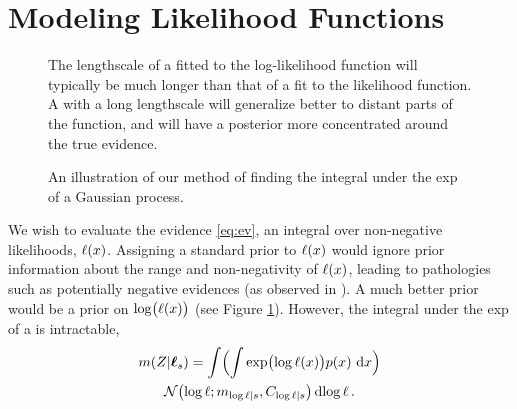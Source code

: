 \documentclass{article}
\begin{document}
\section{Modeling Likelihood Functions}\label{sec:model_lik}
%
 \begin{figure}
 \centering
 \caption{The lengthscale of a \gpb fitted to the log-likelihood function will typically be much longer than that of a \gpb fit to the likelihood function.  A \gpb with a long lengthscale will generalize better to distant parts of the function, and will have a posterior more concentrated around the true evidence. }
 \label{fig:log_is_better}
 \end{figure}
%
\begin{figure}
\centering
{}
\caption{An illustration of our method of finding the integral under the exp of a Gaussian process.}
\label{fig:delta}
\end{figure}
%
We wish to evaluate the evidence \eqref{eq:ev}, an integral over non-negative likelihoods, $\lfn(\lfv)$. Assigning a standard \gpb prior to $\lfn(\lfv)$ would ignore prior information about the range and non-negativity of $\lfn(\lfv)$, leading to pathologies such as potentially negative evidences (as observed in \citet{BZMonteCarlo}).  A much better prior would be a \gpb prior on $\log\bigl(\lfn(x)\bigr)$ (see Figure \ref{fig:log_is_better}). However, the integral under the exp of a \gpb is intractable,
\begin{multline}\label{eq:minty_l}
\mean{\If}{\vr_s}
 =\int \Bigl( \int \exp\bigl(\tr(\lfv)\bigr)\po{\lfv}\,\ud\lfv\Bigr)\\
\N{\tr}{\meancondfn{\tr}{s}}{C_{\tr|s}} \ud \tr\,.
\end{multline}
\end{document}
